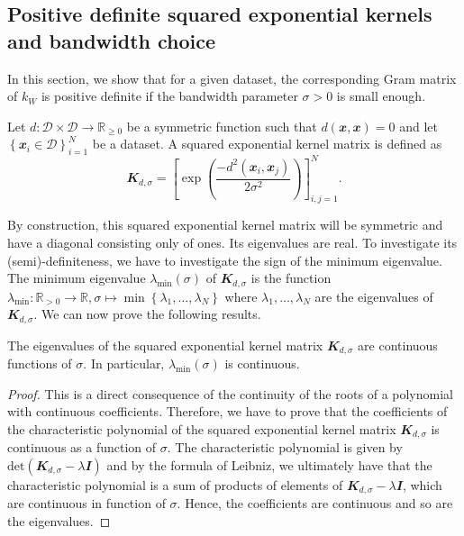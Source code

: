 \subsection{Positive definite squared exponential kernels and bandwidth choice}
In this section, we show that for a given dataset, the corresponding Gram matrix of $k_W$ is positive definite if the bandwidth parameter $\sigma>0$ is small enough. 
\begin{definition}\label{def1}
Let $d: \mathcal{D} \times \mathcal{D} \rightarrow \mathbb{R}_{\geq 0}$ be a symmetric function such that $d(\mathbfit{x},\mathbfit{x}) =0$ and let $\left\{\mathbfit{x}_i \in \mathcal{D} \right\}_{i=1}^N$ be a dataset. A squared exponential kernel matrix is defined as
\begin{equation*}
    \mathbfit{K}_{d,\sigma} = \left[\exp\left( \dfrac{-d^2(\mathbfit{x}_i,\mathbfit{x}_j)}{2\sigma^2} \right) \right]_{i,j=1}^N.
\end{equation*}
\end{definition}
By construction, this squared exponential kernel matrix will be symmetric and have a diagonal consisting only of ones. Its eigenvalues are real. To investigate its (semi)-definiteness, we have to investigate the sign of the minimum eigenvalue.
The minimum eigenvalue $\lambda_{\mathrm{min}}\left( \sigma \right)$ of $\mathbfit{K}_{d,\sigma}$ is the function $\lambda_{\mathrm{min}} : \mathbb{R}_{>0} \rightarrow \mathbb{R}, \sigma \mapsto \min \left\{ \lambda_1, \ldots , \lambda_N \right\}$ where $\lambda_1, \ldots , \lambda_N$ are the eigenvalues of $\mathbfit{K}_{d,\sigma}$.
We can now prove the following results.
\begin{lemma}
\label{lemma1}
The eigenvalues of the squared exponential kernel matrix $\mathbfit{K}_{d,\sigma}$ are continuous functions of $\sigma$. In particular, $\lambda_{\mathrm{min}}\left( \sigma \right)$ is continuous.
\end{lemma}
\begin{proof}
This is a direct consequence of the continuity of the roots of a polynomial with continuous coefficients. Therefore, we have to prove that the coefficients of the characteristic polynomial of the squared exponential kernel matrix $\mathbfit{K}_{d,\sigma}$ is continuous as a function of $\sigma$. The characteristic polynomial is given by $\mathrm{det}\left(\mathbfit{K}_{d,\sigma}-\lambda \mathbfit{I} \right)$ and by the formula of Leibniz, we ultimately have that the characteristic polynomial is a sum of products of elements of $\mathbfit{K}_{d,\sigma}-\lambda \mathbfit{I}$, which are continuous in function of $\sigma$. Hence, the coefficients are continuous and so are the eigenvalues.
\end{proof}

